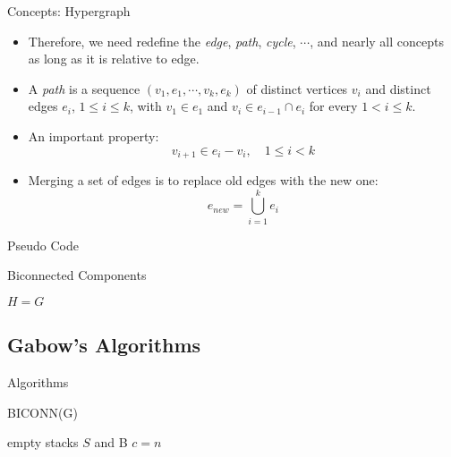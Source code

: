 \documentclass{beamer}
\begin{document}
\begin{frame}{Concepts: Hypergraph}
	\begin{itemize}
		\item
		Therefore, we need redefine the \emph{edge}, \emph{path}, \emph{cycle}, $\cdots$, 
		and nearly all concepts as long as it is relative to edge.
		\item
		A \emph{path} is a sequence $(v_1, e_1, \cdots, v_k, e_k)$ of distinct vertices
		$v_i$ and distinct edges $e_i$, $1\leq i\leq k$, with $v_1\in e_1$ and $v_i\in e_{i-1}\cap e_i$
		for every $1 < i\leq k$.
		\item
		An important property:
		$$v_{i+1}\in e_i-v_i, \quad 1\leq i < k$$
		\item
		Merging a set of edges is to replace old edges with the new one:
		$$e_{new}=\bigcup_{i=1}^ke_i$$
	\end{itemize}
\end{frame}

\begin{frame}{Pseudo Code}
	\SetAlFnt{\small}
	\begin{algorithm}[H]
		\caption{Biconnected Components}
		$H=G$\;
	\end{algorithm}
\end{frame}

\subsection{Gabow's Algorithms}

\begin{frame}{Algorithms}
	\SetAlFnt{\normalsize}
	\begin{procedure}[H]
		\caption{BICONN(G)}
		empty stacks $S$ and B\;
		$c=n$\;
	\end{procedure}
\end{frame}
\end{document}
